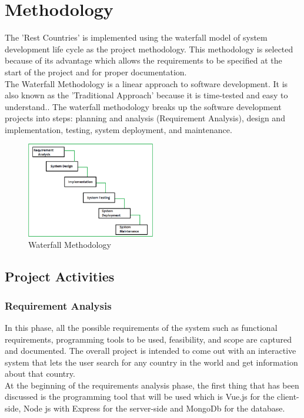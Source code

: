 \documentclass[twoside, a4paper, 12pt]{report}
\begin{document}
\chapter{Methodology}
The 'Rest Countries' is implemented using the waterfall model of system development life cycle as the project methodology. This methodology is selected because of its advantage which allows the requirements to be specified at the start of the project and for proper documentation.\\
\indent
The Waterfall Methodology is a linear approach to software development. It is also known as the 'Traditional Approach' because it is time-tested and easy to understand.\autocite{adenowo2013software}. The waterfall methodology breaks up the software development projects into steps: planning and analysis (Requirement Analysis), design and implementation, testing, system deployment, and maintenance.

\begin{figure} [h]
	\centering
	\includegraphics[width=0.5\textwidth]{waterfallmodelimg}
	\caption{Waterfall Methodology}
	\label{waterfall-methodology}
\end{figure}

\section{Project Activities}

\subsection{Requirement Analysis}
In this phase, all the possible requirements of the system such as functional requirements, programming tools to be used, feasibility, and scope are captured and documented. The overall project is intended to come out with an interactive system that lets the user search for any country in the world and get information about that country.\\
\indent
At the beginning of the requirements analysis phase, the first thing that has been discussed is the programming tool that will be used which is Vue.js for the client-side, Node js with Express for the server-side and MongoDb for the database.
\end{document}
